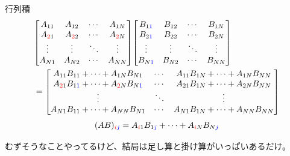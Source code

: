\documentclass[dvipdfm]{beamer}
\begin{document}
\begin{frame}{行列積}
    \begin{equation*}
        \begin{split}
            &
            \mqty[
                A_{11} & A_{12} & \cdots & A_{1N}
                \\
                A_{\red{2}1} & A_{\red{2}2} & \cdots & A_{\red{2}N}
                \\
                \vdots & \vdots & \ddots & \vdots
                \\
                A_{N1} & A_{N2} & \cdots & A_{NN}
            ]
            \mqty[
                B_{1\blue{1}} & B_{12} & \cdots & B_{1N}
                \\
                B_{2\blue{1}} & B_{22} & \cdots & B_{2N}
                \\
                \vdots & \vdots & \ddots & \vdots
                \\
                B_{N\blue{1}} & B_{N2} & \cdots & B_{NN}
            ]
            \\
            &=
            \mqty[
                A_{11}B_{11}+\cdots+A_{1N}B_{N1} & \cdots & A_{11}B_{1N}+\cdots+A_{1N}B_{NN}
                \\
                A_{\red{2}1}B_{1\blue{1}}+\cdots+A_{\red{2}N}B_{N\blue{1}} & \cdots & A_{21}B_{1N}+\cdots+A_{2N}B_{NN}
                \\
                \vdots & \ddots & \vdots
                \\
                A_{N1}B_{11}+\cdots+A_{NN}B_{N1} & \cdots & A_{N1}B_{1N}+\cdots+A_{NN}B_{NN}
            ]
        \end{split}
    \end{equation*}
    \begin{equation*}
        (AB)_{\textcolor{red}{i}\textcolor{blue}{j}}
        =
        A_{\textcolor{red}{i}1}B_{1\textcolor{blue}{j}}+\cdots+A_{\textcolor{red}{i}N}B_{N\textcolor{blue}{j}}
    \end{equation*}

    むずそうなことやってるけど、結局は足し算と掛け算がいっぱいあるだけ。
\end{frame}
\end{document}

